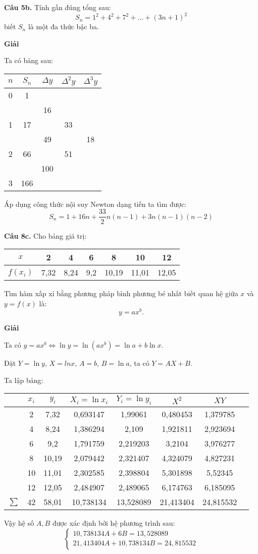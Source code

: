 \textbf{Câu 5b.} Tính gần đúng tổng sau:
$$S_n=1^2 + 4^2 +7^2 + \ldots + (3n+1)^2 $$
biết $S_n$ là một đa thức bậc ba.\par

\textbf{Giải}\par
Ta có bảng sau:
\begin{longtable}{|c|c|c|c|c|}\hline
	$n$&$S_n$&$\Delta y$&$\Delta^2 y$&$\Delta^3 y$\\\hline
	\endhead
	0&1&&&\\\hline
	&&16&&\\\hline
	1&17&&33&\\\hline
	&&49&&18\\\hline
	2&66&&51&\\\hline
	&&100&&\\\hline
	3&166&&&\\\hline
\end{longtable}

Áp dụng công thức nội suy Newton dạng tiến ta tìm được:
$$S_n= 1+ 16n + \frac{33}{2}n(n-1)+3n(n-1)(n-2)$$

\textbf{Câu 8c.} Cho bảng giá trị:\\
\begin{longtable}{|c|c|c|c|c|c|c|}\hline
	$x$&2&4&6&8&10&12\\\hline
	$f(x_i)$&7,32&8,24&9,2&10,19&11,01&12,05\\\hline
\end{longtable}

Tìm hàm xấp xỉ bằng phương pháp bình phương bé nhất biết quan hệ giữa $x$ và $y=f(x)$ là:
$$y=ax^b.$$

\textbf{Giải}\par
Ta có $y=ax^b\Leftrightarrow\ln y=\ln\left(ax^b\right)=\ln a+b\ln x$.\par
Đặt $Y=\ln y$, $X=lnx$, $A=b$, $B=\ln a$, ta có $Y=AX+B$.\par
Ta lập bảng:
\begin{longtable}{|Sc|c|c|c|c|c|c|}\hline
	&$x_i$&$y_i$&$X_i=\ln{x_i}$&$Y_i=\ln{y_i}$&$X^2$&$XY$\\\hline
	\endhead
	&2&7,32&0,693147&1,99061&0,480453&1,379785\\\hline
	&4&8,24&1,386294&2,109&1,921811&2,923694\\\hline
	&6&9,2&1,791759&2,219203&3,2104&3,976277\\\hline
	&8&10,19&2,079442&2,321407&4,324079&4,827231\\\hline
	&10&11,01&2,302585&2,398804&5,301898&5,52345\\\hline
	&12&12,05&2,484907&2,489065&6,174763&6,185095\\\hline
	$\sum$&42&58,01&10,738134&13,528089&21,413404&24,815532\\\hline
\end{longtable}
Vậy hệ số $A,B$ được xác định bởi hệ phương trình sau:
$$\begin{cases}
10,738134A+6B=13,528089 \\
21,413404A+10,738134B=24,815532
\end{cases}$$

